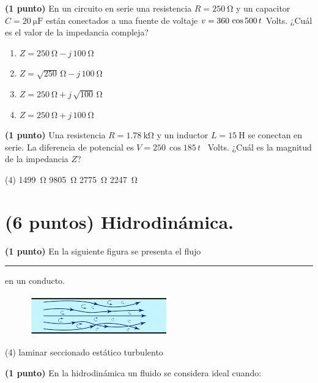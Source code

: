 \documentclass[12pt, letter]{exam}
\begin{document}
\begin{questions}
    \newpage

    \question \textbf{(1 punto)} En un circuito en serie una resistencia $R = \SI{250}{\ohm}$ y un capacitor $C = \SI{20}{\micro\farad}$ están conectados a una fuente de voltaje $v = \num 360 \, \cos 500 \, t$ Volts. ¿Cuál es el valor de la impedancia compleja?
    \begin{multicols}{2}
        \begin{enumerate}[label=\Alph*)]
            \item $Z = \SI{250}{\ohm} - j \, \SI{100}{\ohm}$
            \item $Z = \sqrt{250} \, \si{\ohm} - j \, \SI{100}{\ohm}$
            \item $Z = \SI{250}{\ohm} + j \, \sqrt{100} \, \si{\ohm}$
            \item $Z = \SI{250}{\ohm} + j \, \SI{100}{\ohm}$
        \end{enumerate}
    \end{multicols}
    \question \textbf{(1 punto)} Una resistencia $R = \SI{1.78}{\kilo\ohm}$ y un inductor $L = \SI{15}{\henry}$ se conectan en serie. La diferencia de potencial es $V = \num{250} \, \cos 185 \, t$ \, Volts. ¿Cuál es la magnitud de la impedancia $Z$?
    \begin{tasks}(4)
        \task \SI{1499}{\ohm}
        \task \SI{9805}{\ohm}
        \task \SI{2775}{\ohm}
        \task \SI{2247}{\ohm}
    \end{tasks}

    \section{(6 puntos) Hidrodinámica.}

    \question\textbf{(1 punto)} En la siguiente figura se presenta el flujo \rule{2cm}{0.1mm} en un conducto.
    \begin{figure}[H]
        \centering
        \includegraphics[scale=0.8]{Flujo_01_Turbulento.png}
    \end{figure}
    \begin{tasks}(4)
        \task laminar
        \task seccionado
        \task estático
        \task turbulento
    \end{tasks}
    \question\textbf{(1 punto)} En la hidrodinámica un fluido se considera ideal cuando:
    \begin{parts}

\end{parts}
\end{questions}
\end{document}
